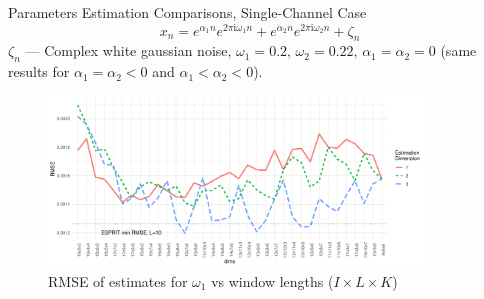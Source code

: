 \documentclass[pdf, unicode, ucs, notheorems]{beamer}
\theoremstyle{definition}
\begin{document}
\begin{frame}{Parameters Estimation Comparisons, Single-Channel Case}
  \vspace*{-0.3cm}
  \[
    x_{n} = e^{ \alpha_1 n } e^{2 \pi\mathrm{i} \omega_1 n} +
    e^{ \alpha_2 n } e^{ 2 \pi  \mathrm{i}\omega_2 n} + \zeta_n
  \]
  $\zeta_n$ --- Complex white gaussian noise, $\omega_1 = 0.2,\,
  \omega_2 = 0.22$, $\alpha_1=\alpha_2=0$ (same results for
  $\alpha_1=\alpha_2 < 0$ and $\alpha_1 < \alpha_2 < 0$).

  \begin{figure}
    \centering
    \includegraphics[width=0.89\textwidth]{img/freq1_dims_no_rates.pdf}
    \caption{RMSE of estimates for $\omega_1$ vs window lengths
    ($I\times L \times K$)}
  \end{figure}
\end{frame}
\end{document}
